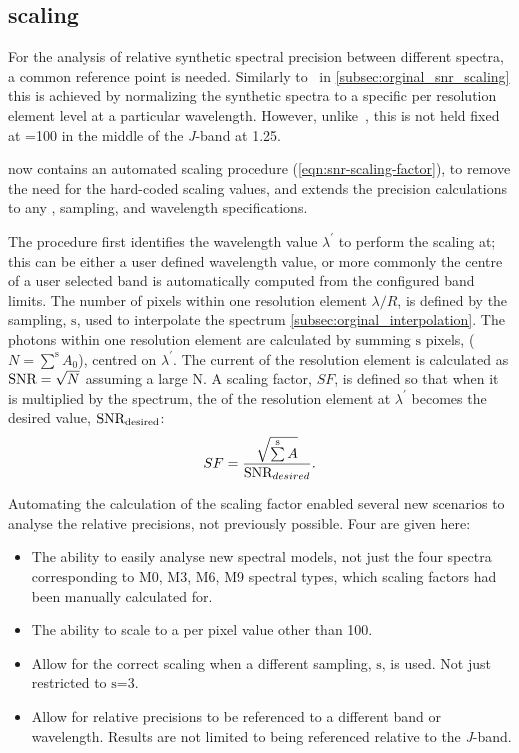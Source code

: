 \subsection{\snr{} scaling}
\label{subsec:snr_scaling}
For the analysis of relative synthetic spectral precision between different spectra, a common reference point is needed.
Similarly to~\citet{figueira_radial_2016} in \cref{subsec:orginal_snr_scaling} this is achieved by normalizing the synthetic spectra to a specific \snr{} per resolution element level at a particular wavelength.
However, unlike~\citet{figueira_radial_2016}, this is not held fixed at \snr{}=100 in the middle of the \emph{J}-band at 1.25\um{}.

\Eniric{} now contains an automated \snr{} scaling procedure (\cref{eqn:snr-scaling-factor}), to remove the need for the hard-coded scaling values, and extends the precision calculations to any \snr{}, sampling, and wavelength specifications.

The procedure first identifies the wavelength value \(\lambda^\prime\) to perform the scaling at; this can be either a user defined wavelength value, or more commonly the centre of a user selected band is automatically computed from the configured band limits.
The number of pixels within one resolution element \(\lambda/R\), is defined by the sampling, \(\mathrm{s}\), used to interpolate the spectrum \cref{subsec:orginal_interpolation}.
The photons within one resolution element are calculated by summing \(\mathrm{s}\) pixels, (\(N=\sum\limits^{\mathrm{s}}{{A}_{0}}\)), centred on \(\lambda^\prime\).
The current \snr{} of the resolution element is calculated as \(\textrm{SNR}{} = \sqrt{N}\) assuming a large N.
A scaling factor, \(SF\), is defined so that when it is multiplied by the spectrum, the \snr{} of the resolution element at \(\lambda^\prime\) becomes the desired value, \({\textrm{SNR}{}}_{\textrm{desired}}\):
\begin{equation}
SF =  \frac{\sqrt{\sum\limits^{\mathrm{s}} A}} {\textrm{SNR}{}_{desired}}. \label{eqn:snr-scaling-factor}
\end{equation}

Automating the calculation of the scaling factor enabled several new scenarios to analyse the relative precisions, not previously possible.
Four are given here:
\begin{itemize}
    \setlength\itemsep{-0.3em} %
    \item The ability to easily analyse new spectral models, not just the four spectra corresponding to {M0}, {M3}, {M6}, {M9} spectral types, which scaling factors had been manually calculated for.
    \item The ability to scale to a \snr{} per pixel value other than 100.
    \item Allow for the correct scaling when a different sampling, \(\mathrm{s}\), is used.
    Not just restricted to \(\mathrm{s}\)=3.
    \item Allow for relative precisions to be referenced to a different band or wavelength.
    Results are not limited to being referenced relative to the \textit{J}-band.
\end{itemize}

